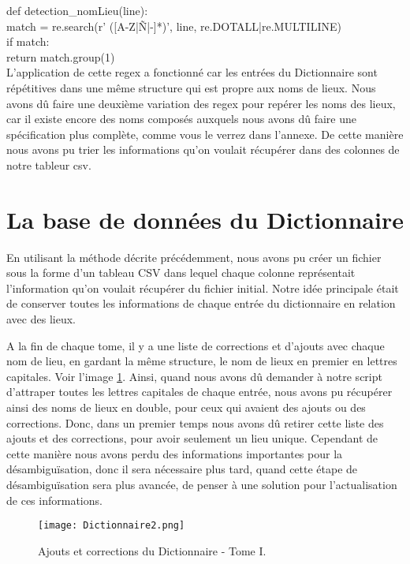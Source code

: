 \documentclass[a4paper,12pt,twoside]{book}
\begin{document}
def detection\_nomLieu(line):\\
match = re.search(r' ([A-Z|Ñ|-]*)', line, re.DOTALL|re.MULTILINE)\\
if match:\\
return match.group(1)\\


L’application de cette regex a fonctionné car les entrées du Dictionnaire sont répétitives dans une même structure qui est propre aux noms de lieux. Nous avons dû faire une deuxième variation des regex pour repérer les noms des lieux, car il existe encore des noms composés auxquels nous avons dû faire une spécification plus complète, comme vous le verrez dans l’annexe. De cette manière nous avons pu trier les informations qu’on voulait récupérer dans des colonnes de notre tableur csv. 


\section{La base de données du Dictionnaire}

En utilisant la méthode décrite précédemment, nous avons pu créer un fichier sous la forme d’un tableau \Gls{CSV} dans lequel chaque colonne représentait l’information qu’on voulait récupérer du fichier initial. Notre idée principale était de conserver toutes les informations de chaque entrée du dictionnaire en relation avec des lieux. 

A la fin de chaque tome, il y a une liste de corrections et d’ajouts avec chaque nom de lieu, en gardant la même structure, le nom de lieux en premier en lettres capitales. Voir l'image \ref{cinqFig}. Ainsi, quand nous avons dû demander à notre script d’attraper toutes les lettres capitales de chaque entrée, nous avons pu récupérer ainsi des noms de lieux en double, pour ceux qui avaient des ajouts ou des corrections. Donc, dans un premier temps nous avons dû retirer cette liste des ajouts et des corrections, pour avoir seulement un lieu unique. Cependant de cette manière nous avons perdu des informations importantes pour la désambiguïsation, donc il sera nécessaire plus tard, quand cette étape de désambiguïsation sera plus avancée, de penser à une solution pour l’actualisation de ces informations.

\begin{figure}[!h]
    \centering
    \texttt{[image: Dictionnaire2.png]}
    \caption{Ajouts et corrections du Dictionnaire - Tome I.}
    \label{cinqFig}
\end{figure}
\end{document}
